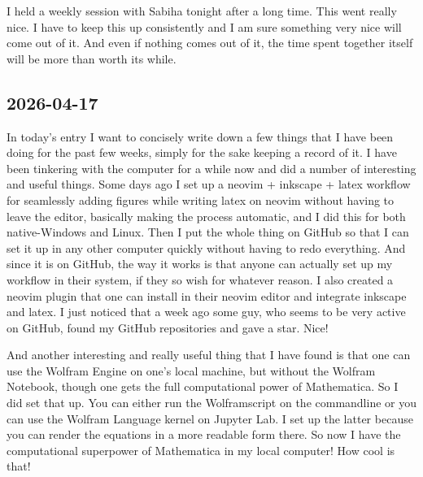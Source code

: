 \documentclass[11pt,a4paper]{article}
\begin{document}
I held a weekly session with Sabiha tonight after a long time. This went really nice. I have to keep this up consistently and I am sure something very nice will come out of it. And even if nothing comes out of it, the time spent together itself will be more than worth its while. 




\subsection{2026-04-17}
In today's entry I want to concisely write down a few things that I have been doing for the past few weeks, simply for the sake keeping a record of it. I have been tinkering with the computer for a while now and did a number of interesting and useful things. Some days ago I set up a neovim + inkscape + latex workflow for seamlessly adding figures while writing latex on neovim without having to leave the editor, basically making the process automatic, and I did this for both native-Windows and Linux. Then I put the whole thing on GitHub so that I can set it up in any other computer quickly without having to redo everything. And since it is on GitHub, the way it works is that anyone can actually set up my workflow in their system, if they so wish for whatever reason. I also created a neovim plugin that one can install in their neovim editor and integrate inkscape and latex. I just noticed that a week ago some guy, who seems to be very active on GitHub, found my GitHub repositories and gave a star. Nice!  

And another interesting and really useful thing that I have found is that one can use the Wolfram Engine on one's local machine, but without the Wolfram Notebook, though one gets the full computational power of Mathematica. So I did set that up. You can either run the Wolframscript on the commandline or you can use the Wolfram Language kernel on Jupyter Lab. I set up the latter because you can render the equations in a more readable form there. So now I have the computational superpower of Mathematica in my local computer! How cool is that! 
\end{document}
